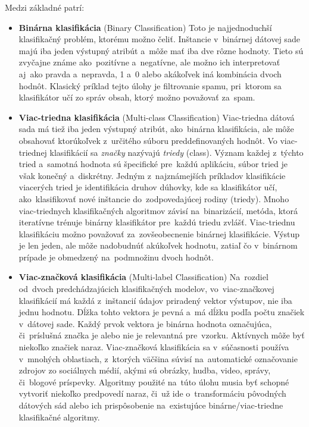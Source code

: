 Medzi základné patrí: 
\begin{itemize}
    \item \textbf{Binárna klasifikácia} (Binary Classification) Toto je najjednoduchší klasifikačný problém, ktorému možno čeliť. Inštancie v~binárnej dátovej sade majú iba jeden výstupný atribút a~môže mať iba dve rôzne hodnoty. Tieto sú zvyčajne známe ako~pozitívne a~negatívne, ale možno ich interpretovať aj~ako pravda a~nepravda, 1 a~0 alebo akákoľvek iná kombinácia dvoch hodnôt. Klasický príklad tejto  úlohy je filtrovanie spamu, pri~ktorom sa klasifikátor učí zo správ obsah, ktorý možno považovať za~spam.
    
    \item \textbf{Viac-triedna klasifikácia} (Multi-class Classification) Viac-triedna dátová sada má tiež iba jeden výstupný atribút, ako~binárna klasifikácia, ale môže obsahovať ktorúkoľvek z~určitého súboru preddefinovaných hodnôt. Vo viac-triednej klasifikácií sa \textit{značky} nazývajú \textit{triedy} (class). Význam každej z~týchto tried a~samotná hodnota sú špecifické pre~každú aplikáciu, súbor tried je však konečný a~diskrétny. Jedným z~najznámejších príkladov klasifikácie viacerých tried je identifikácia druhov dúhovky, kde sa klasifikátor učí, ako~klasifikovať nové inštancie do~zodpovedajúcej rodiny (triedy). Mnoho viac-triednych klasifikačných algoritmov závisí na~binarizácií, metóda, ktorá iteratívne trénuje binárny klasifikátor pre~každú triedu zvlášť. Viac-triednu klasifikáciu možno považovať za~zovšeobecnenie binárnej klasifikácie. Výstup je len jeden, ale môže nadobudnúť akúkoľvek hodnotu, zatiaľ čo v~binárnom prípade je obmedzený na~podmnožinu dvoch hodnôt.
    
    \item \textbf{Viac-značková klasifikácia} (Multi-label Classification) Na~rozdiel od~dvoch predchádzajúcich klasifikačných modelov, vo~viac-značkovej klasifikácií má každá z~inštancií údajov priradený vektor výstupov, nie iba jednu hodnotu. Dĺžka tohto vektora je pevná a~má dĺžku podľa počtu značiek v~dátovej sade. Každý prvok vektora je binárna hodnota označujúca, či~príslušná značka je alebo nie je relevantná pre~vzorku. Aktívnych môže byť niekoľko značiek naraz. Viac-značková klasifikácia sa v~súčasnosti používa v~mnohých oblastiach, z~ktorých väčšina súvisí na~automatické označovanie zdrojov zo sociálnych médií, akými sú obrázky, hudba, video, správy, či~blogové príspevky. Algoritmy použité na~túto úlohu musia byť schopné vytvoriť niekoľko predpovedí naraz, či~už ide o~transformáciu pôvodných dátových sád alebo ich prispôsobenie na~existujúce binárne/viac-triedne klasifikačné algoritmy.
\end{itemize}


